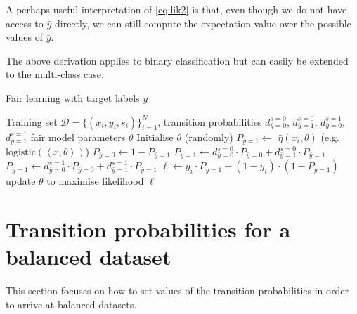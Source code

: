 A perhaps useful interpretation of \eqref{eq:lik2} is that,
even though we do not have access to $\bar{y}$ directly,
we can still compute the expectation value over the possible values of $\bar{y}$.

The above derivation applies to binary classification but can easily be extended to the multi-class case.

\begin{algorithm}[tb]
  \caption{Fair learning with target labels $\bar{y}$}%
  \label{alg:fair}
  \begin{algorithmic}[1]
    \REQUIRE Training set $\mathcal{D} = \{(x_i, y_i, s_i)\}^N_{i=1}$, transition probabilities $d^{s=0}_{\bar{y}=0}$,
             $d^{s=0}_{\bar{y}=1}$, $d^{s=1}_{\bar{y}=0}$, $d^{s=1}_{\bar{y}=1}$
    \ENSURE fair model parameters $\theta$
    \STATE Initialise $\theta$ (randomly)
      \STATE $P_{\bar{y}=1} \gets$ $\bar{\eta}(x_i,\theta)$ (e.g. $\text{logistic}(\left\langle x,\theta\right\rangle)$)
      \STATE $P_{\bar{y}=0} \gets 1 - P_{\bar{y}=1}$
        \STATE $P_{y=1} \gets d^{s=0}_{\bar{y}=0} \cdot P_{\bar{y}=0} + d^{s=0}_{\bar{y}=1} \cdot P_{\bar{y}=1}$
      \ELSE
        \STATE $P_{y=1} \gets d^{s=1}_{\bar{y}=0} \cdot P_{\bar{y}=0} + d^{s=1}_{\bar{y}=1} \cdot P_{\bar{y}=1}$
      \ENDIF
      \STATE $\ell \gets y_i \cdot P_{y=1} + (1-y_i) \cdot (1- P_{y=1})$
      \STATE update $\theta$ to maximise likelihood $\ell$
    \ENDFOR
  \end{algorithmic}
\end{algorithm}

\section{Transition probabilities for a balanced dataset}\label{sec:fairness}
This section focuses on how to set values of the transition probabilities in order to arrive at balanced datasets.

